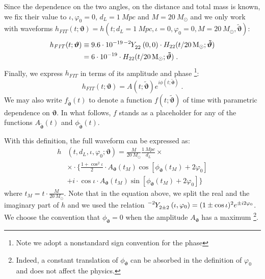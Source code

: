 Since the dependence on the two angles, on the distance and total mass is known, we fix their value to ${\iota, \varphi_0 = 0}$, ${d_L = \SI{1}{Mpc}}$ and $M = \SI{20}{M_\odot}$ and we only work with waveforms ${h_{FIT}(t; \boldsymbol{\vartheta}) = h(t; d_L = \SI{1}{Mpc}, \iota = 0, \varphi_0 = 0, M = \SI{20}{M_\odot}, \boldsymbol{\tilde{\vartheta}}) }$:
\begin{align}  
	h_{FIT}(t; \boldsymbol{\vartheta}) &\equiv 9.6 \cdot 10^{-19} \tensor[^{-2}]{Y}{_{2 2}}(0,0) \cdot H_{22}(t/\SI{20}{M_\odot}; \boldsymbol{\tilde{\vartheta}})  \nonumber \\
	&= 6 \cdot 10^{-19} \cdot H_{22}(t/\SI{20}{M_\odot}; \boldsymbol{\tilde{\vartheta}}) \label{eq:h_std} \; .
\end{align}
Finally, we express  $h_{FIT}$ in terms of its amplitude and phase
\footnote{Note we adopt a nonstandard sign convention for the phase}:
\begin{equation} \label{eq:h_ML}
	h_{FIT}(t; \boldsymbol{\vartheta}) = A(t; \boldsymbol{\tilde{\vartheta}}) e^{i \phi(t; \boldsymbol{\tilde{\vartheta}})} \; . 
\end{equation}
We may also write $f_{\boldsymbol{\tilde{\vartheta}}}(t)$ to denote a function $f(t;\boldsymbol{\tilde{\vartheta}})$ of time with parametric dependence on $\boldsymbol{\vartheta}$.
In what follows, $f$ stands as a placeholder for any of the functions $A_{\tilde{\boldsymbol{\vartheta}}}(t)$ and ${\phi}_{\tilde{\boldsymbol{\vartheta}}}(t)$.
\par
With this definition, the full waveform can be expressed as:
\begin{align} 
	h&(t, d_L,\iota,\varphi_0; \boldsymbol{\vartheta}) = \frac{M}{\SI{20}{M_\odot}} \frac{\SI{1}{Mpc}}{d_L} \times  \nonumber \\
		&\times \cdot \Bigg\{ \frac{1+\cos^2\iota}{2} \cdot A_{\boldsymbol{\vartheta}}(t_M)  \cos[\phi_{\boldsymbol{\vartheta}}(t_M)+2\varphi_0]  \nonumber \\
		&+ i \cdot \cos\iota \cdot A_{\boldsymbol{\vartheta}}(t_M)
 \sin[\phi_{\boldsymbol{\vartheta}}(t_M)+2\varphi_0] \Bigg\}
\label{eq:h_parametrization_simple}
\end{align}
where $t_M = t \cdot \frac{M}{\SI{20}{M_\odot}}$.
Note that in the equation above, we split the real and the imaginary part of $h$ and we used the relation ${\tensor[^{-2}]{Y}{_{2 \pm 2}}(\iota, \varphi_0) = (1 \pm \cos \iota)^2 e^{\pm i 2 \varphi_0}}$.
We choose the convention that $\phi_{\boldsymbol{\vartheta}} = 0$ when the amplitude $A_{\boldsymbol{\vartheta}}$ has a maximum
\footnote{Indeed, a constant translation of $\phi_{\boldsymbol{\vartheta}}$ can be absorbed in the definition of $\varphi_0$ and does not affect the physics.}.
\par
{}

